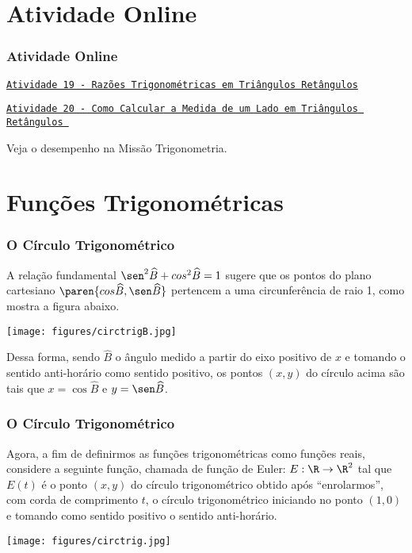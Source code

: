 \documentclass[brazil, notheorems, 10pt]{beamer}
\begin{document}
\section{Atividade Online}
\begin{frame}
\frametitle{Atividade Online} %

\href{https://pt.khanacademy.org/math/trigonometry/trigonometry-right-triangles/intro-to-the-trig-ratios/e/trigonometry_1}
{{\tt Atividade 19 - Razões Trigonométricas em Triângulos
Retângulos}}

\href{https://pt.khanacademy.org/math/trigonometry/trigonometry-right-triangles/trig-solve-for-a-side/e/trigonometry_2}
{{\tt Atividade 20 - Como Calcular a Medida de um Lado em Triângulos
Retângulos }}


Veja o desempenho na Missão Trigonometria.


\end{frame}

\section{Funções Trigonométricas}
\begin{frame}
\frametitle{O Círculo Trigonométrico} %

A relação fundamental $\sen^2 \widehat B + \cos^2 \widehat B = 1$
sugere que os pontos do plano cartesiano $\paren{\cos \widehat B,
\sen \widehat B}$ pertencem a uma circunferência de raio 1, como
mostra a figura abaixo.
\begin{center}
\texttt{[image: figures/circtrigB.jpg]}
\end{center}

Dessa forma, sendo $\widehat B$ o ângulo medido a partir do eixo
positivo de $x$ e tomando o sentido anti-horário como sentido
positivo, os pontos $(x, y)$ do círculo acima são tais que $x = \cos
\widehat B$ e $y = \sen \widehat B$.


\end{frame}




\begin{frame}
\frametitle{O Círculo Trigonométrico} %

Agora, a fim de definirmos as funções trigonométricas como funções
reais, considere a seguinte função, chamada de função de Euler: $E:
\R \to \R^2$ tal que $E(t)$ é o ponto $(x, y)$ do círculo
trigonométrico obtido após ``enrolarmos'', com corda de comprimento
$t$, o círculo trigonométrico iniciando no ponto $(1, 0)$ e tomando
como sentido positivo o sentido anti-horário.
\begin{center}
\texttt{[image: figures/circtrig.jpg]}
\end{center}
\end{frame}
\end{document}
